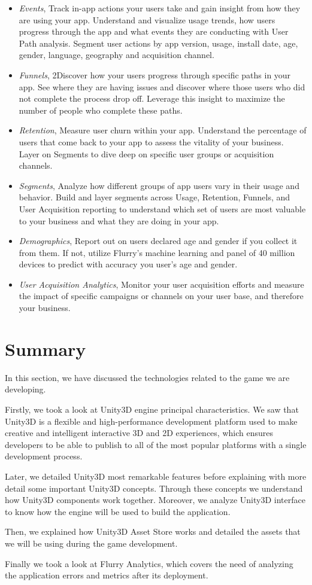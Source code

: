 \begin{itemize}
\item \textit{Events}, Track in-app actions your users take and gain insight from how they are using your app. Understand and visualize usage trends, how users progress through the app and what events they are conducting with User Path analysis. Segment user actions by app version, usage, install date, age, gender, language, geography and acquisition channel.
\item \textit{Funnels}, 2Discover how your users progress through specific paths in your app. See where they are having issues and discover where those users who did not complete the process drop off. Leverage this insight to maximize the number of people who complete these paths.
\item \textit{Retention}, Measure user churn within your app. Understand the percentage of users that come back to your app to assess the vitality of your business. Layer on Segments to dive deep on specific user groups or acquisition channels.
\item \textit{Segments}, Analyze how different groups of app users vary in their usage and behavior. Build and layer segments across Usage, Retention, Funnels, and User Acquisition reporting to understand which set of users are most valuable to your business and what they are doing in your app.
\item \textit{Demographics}, Report out on users declared age and gender if you collect it from them. If not, utilize Flurry’s machine learning and panel of 40 million devices to predict with accuracy you user’s age and gender.
\item \textit{User Acquisition Analytics}, Monitor your user acquisition efforts and measure the impact of specific campaigns or channels on your user base, and therefore your business.
\end{itemize}

\section{Summary}
In this section, we have discussed the technologies related to the game we are developing.

Firstly, we took a look at Unity3D engine principal characteristics. We saw that Unity3D is a flexible and high-performance development platform used to make creative and intelligent interactive 3D and 2D experiences, which ensures developers to be able to publish to all of the most popular platforms with a single development process.

Later, we detailed Unity3D most remarkable features before explaining with more detail some important Unity3D concepts. Through these concepts we understand how Unity3D components work together. Moreover, we analyze Unity3D interface to know how the engine will be used to build the application.

Then, we explained how Unity3D Asset Store works and detailed the assets that we will be using during the game development.

Finally we took a look at Flurry Analytics, which covers the need of analyzing the application errors and metrics after its deployment.
